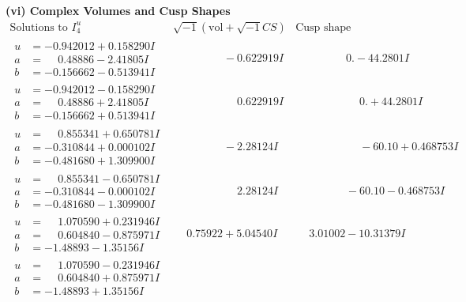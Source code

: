 \documentclass[1p]{elsarticle_modified}
\theoremstyle{definition}
\newcommand{\I}{\sqrt{-1}}
\begin{document}
\newpage\flushleft \textbf{(vi) Complex Volumes and Cusp Shapes}
$$\begin{array}{c|c|c}  
\text{Solutions to }I^u_{4}& \I (\text{vol} + \sqrt{-1}CS) & \text{Cusp shape}\\
 \hline 
\begin{aligned}
u &= -0.942012 + 0.158290 I \\
a &= \phantom{-}0.48886 - 2.41805 I \\
b &= -0.156662 - 0.513941 I\end{aligned}
 & \phantom{-0.000000 } -0.622919 I & \phantom{-0.000000 } 0. - 44.2801 I \\ \hline\begin{aligned}
u &= -0.942012 - 0.158290 I \\
a &= \phantom{-}0.48886 + 2.41805 I \\
b &= -0.156662 + 0.513941 I\end{aligned}
 & \phantom{-0.000000 -}0.622919 I & \phantom{-0.000000 -}0. + 44.2801 I \\ \hline\begin{aligned}
u &= \phantom{-}0.855341 + 0.650781 I \\
a &= -0.310844 + 0.000102 I \\
b &= -0.481680 + 1.309900 I\end{aligned}
 & \phantom{-0.000000 } -2.28124 I & \phantom{-0.000000 -}     -6
0. 10   + 0.468753 I \\ \hline\begin{aligned}
u &= \phantom{-}0.855341 - 0.650781 I \\
a &= -0.310844 - 0.000102 I \\
b &= -0.481680 - 1.309900 I\end{aligned}
 & \phantom{-0.000000 -}2.28124 I & \phantom{-0.000000 }      -6
0. 10   - 0.468753 I \\ \hline\begin{aligned}
u &= \phantom{-}1.070590 + 0.231946 I \\
a &= \phantom{-}0.604840 - 0.875971 I \\
b &= -1.48893 - 1.35156 I\end{aligned}
 & \phantom{-}0.75922 + 5.04540 I & \phantom{-}3.01002 - 10.31379 I \\ \hline\begin{aligned}
u &= \phantom{-}1.070590 - 0.231946 I \\
a &= \phantom{-}0.604840 + 0.875971 I \\
b &= -1.48893 + 1.35156 I\end{aligned}

\end{array}$$
\end{document}
